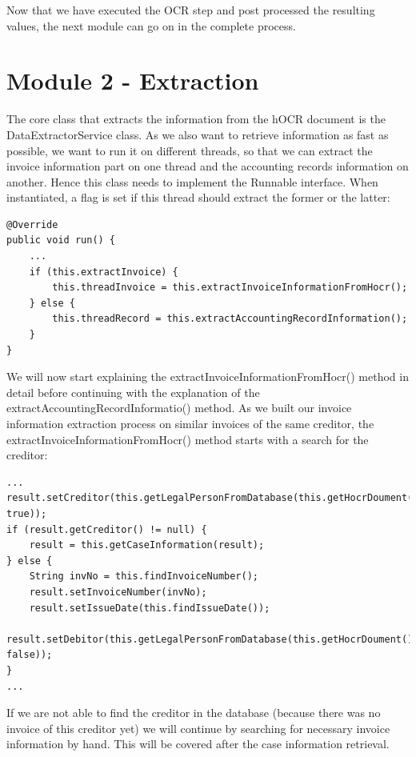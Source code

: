 Now that we have executed the OCR step and post processed the resulting values, the next module can go on in the complete process.

\section{Module 2 - Extraction}
\label{sec5.5}

The core class that extracts the information from the hOCR document is the DataExtractorService class. As we also want to retrieve information as fast as possible, we want to run it on different threads, so that we can extract the invoice information part on one thread and the accounting records information on another. Hence this class needs to implement the Runnable interface. When instantiated, a flag is set if this thread should extract the former or the latter:

\begin{lstlisting}[caption={Beginning of the information extraction}]
@Override
public void run() {
    ...
    if (this.extractInvoice) {
        this.threadInvoice = this.extractInvoiceInformationFromHocr();
    } else {
        this.threadRecord = this.extractAccountingRecordInformation();
    }
}
\end{lstlisting}

We will now start explaining the extractInvoiceInformationFromHocr() method in detail before continuing with the explanation of the extractAccountingRecordInformatio() method.
As we built our invoice information extraction process on similar invoices of the same creditor, the extractInvoiceInformationFromHocr() method starts with a search for the creditor:

\begin{lstlisting}[caption={Call for creditor in the database}]
...
result.setCreditor(this.getLegalPersonFromDatabase(this.getHocrDoument(), true));
if (result.getCreditor() != null) {
    result = this.getCaseInformation(result);
} else {
    String invNo = this.findInvoiceNumber();
    result.setInvoiceNumber(invNo);
    result.setIssueDate(this.findIssueDate());
    result.setDebitor(this.getLegalPersonFromDatabase(this.getHocrDoument(), false));
}
...
\end{lstlisting}

If we are not able to find the creditor in the database (because there was no invoice of this creditor yet) we will continue by searching for necessary invoice information by hand. This will be covered after the case information retrieval.

